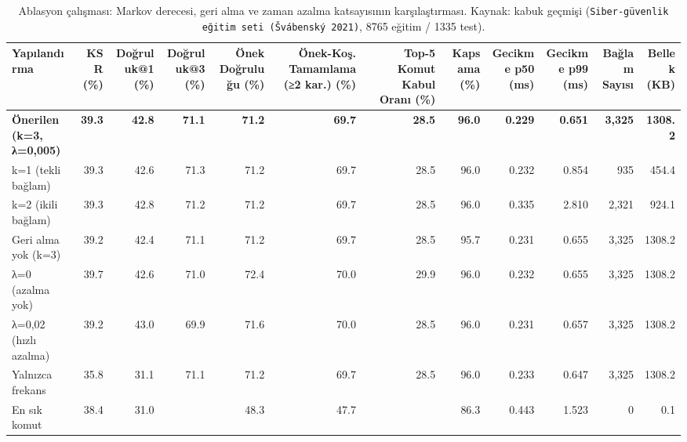 \begin{table}[htbp]
  \centering
  \caption{Ablasyon çalışması: Markov derecesi, geri alma ve zaman azalma katsayısının karşılaştırması. Kaynak: kabuk geçmişi (\texttt{Siber-güvenlik eğitim seti (Švábenský 2021)}, 8765 eğitim / 1335 test).}
  \label{tab:ablation}
  \begin{tabular}{lrrrrrrrrrrr}
    \toprule
    Yapılandırma & KSR (\%) & Doğruluk@1 (\%) & Doğruluk@3 (\%) & Önek Doğruluğu (\%) & Önek-Koş. Tamamlama (≥2 kar.) (\%) & Top-5 Komut Kabul Oranı (\%) & Kapsama (\%) & Gecikme p50 (ms) & Gecikme p99 (ms) & Bağlam Sayısı & Bellek (KB) \\
    \midrule
    \textbf{Önerilen (k=3, λ=0,005)} & \textbf{39.3} & \textbf{42.8} & \textbf{71.1} & \textbf{71.2} & \textbf{69.7} & \textbf{28.5} & \textbf{96.0} & \textbf{0.229} & \textbf{0.651} & \textbf{3,325} & \textbf{1308.2} \\
    k=1 (tekli bağlam) & 39.3 & 42.6 & 71.3 & 71.2 & 69.7 & 28.5 & 96.0 & 0.232 & 0.854 & 935 & 454.4 \\
    k=2 (ikili bağlam) & 39.3 & 42.8 & 71.2 & 71.2 & 69.7 & 28.5 & 96.0 & 0.335 & 2.810 & 2,321 & 924.1 \\
    Geri alma yok (k=3) & 39.2 & 42.4 & 71.1 & 71.2 & 69.7 & 28.5 & 95.7 & 0.231 & 0.655 & 3,325 & 1308.2 \\
    λ=0 (azalma yok) & 39.7 & 42.6 & 71.0 & 72.4 & 70.0 & 29.9 & 96.0 & 0.232 & 0.655 & 3,325 & 1308.2 \\
    λ=0,02 (hızlı azalma) & 39.2 & 43.0 & 69.9 & 71.6 & 70.0 & 28.5 & 96.0 & 0.231 & 0.657 & 3,325 & 1308.2 \\
    Yalnızca frekans & 35.8 & 31.1 & 71.1 & 71.2 & 69.7 & 28.5 & 96.0 & 0.233 & 0.647 & 3,325 & 1308.2 \\
    En sık komut & 38.4 & 31.0 &  & 48.3 & 47.7 &  & 86.3 & 0.443 & 1.523 & 0 & 0.1 \\
    \bottomrule
  \end{tabular}
\end{table}
